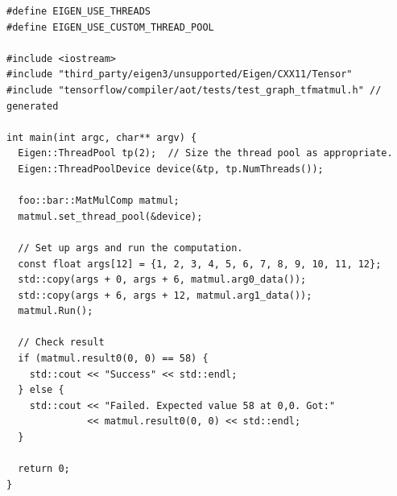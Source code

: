 \documentclass[11pt,openany]{book}
\begin{document}
\begin{verbatim}
#define EIGEN_USE_THREADS
#define EIGEN_USE_CUSTOM_THREAD_POOL

#include <iostream>
#include "third_party/eigen3/unsupported/Eigen/CXX11/Tensor"
#include "tensorflow/compiler/aot/tests/test_graph_tfmatmul.h" // generated

int main(int argc, char** argv) {
  Eigen::ThreadPool tp(2);  // Size the thread pool as appropriate.
  Eigen::ThreadPoolDevice device(&tp, tp.NumThreads());

  foo::bar::MatMulComp matmul;
  matmul.set_thread_pool(&device);

  // Set up args and run the computation.
  const float args[12] = {1, 2, 3, 4, 5, 6, 7, 8, 9, 10, 11, 12};
  std::copy(args + 0, args + 6, matmul.arg0_data());
  std::copy(args + 6, args + 12, matmul.arg1_data());
  matmul.Run();

  // Check result
  if (matmul.result0(0, 0) == 58) {
    std::cout << "Success" << std::endl;
  } else {
    std::cout << "Failed. Expected value 58 at 0,0. Got:"
              << matmul.result0(0, 0) << std::endl;
  }

  return 0;
}
\end{verbatim}

\appendix %
\printnotes*
\end{document}
